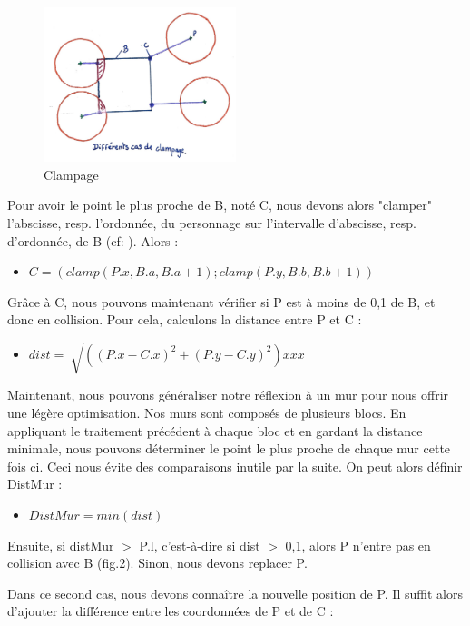 \documentclass[11pt]{article}
\begin{document}
\begin{figure}
	\centering
	\includegraphics[width=0.5\textwidth]{image/fig4.jpg}
	\caption{Clampage}
	\label{fig:clampage}
\end{figure}

Pour avoir le point le plus proche de B, noté C, nous devons alors "clamper" 
l'abscisse, resp. l'ordonnée, du personnage sur l'intervalle d'abscisse, 
resp. d'ordonnée, de B (cf: ). Alors :

\begin{itemize}
	\item[] $C = (clamp(P.x, B.a, B.a +1) ; clamp(P.y, B.b, B.b +1))$
\end{itemize}

Grâce à C, nous pouvons maintenant vérifier si P est à moins de 0,1 de B, 
et donc en collision. Pour cela, calculons la distance entre P et C :
\begin{itemize}
	\item[] $dist = \sqrt[]{((P.x - C.x)^2 + (P.y - C.y)^2) xx  x}$
\end{itemize}

Maintenant, nous pouvons généraliser notre réflexion à un mur pour nous 
offrir une légère optimisation. Nos murs sont composés de plusieurs blocs. 
En appliquant le traitement précédent à chaque bloc et en gardant la 
distance minimale, nous pouvons déterminer le point le plus proche de 
chaque mur cette fois ci. Ceci nous évite des comparaisons inutile par la 
suite. On peut alors définir DistMur :

\begin{itemize}
	\item[] $DistMur = min(dist)$
\end{itemize}


Ensuite, si distMur $>$ P.l, c'est-à-dire si dist $>$ 0,1, alors P n'entre pas 
en collision avec B (fig.2). Sinon, nous devons replacer P.

Dans ce second cas, nous devons connaître la nouvelle position de P. Il 
suffit alors d'ajouter la différence entre les coordonnées de P et de C :
\end{document}
